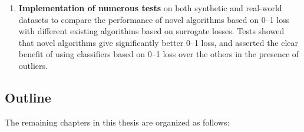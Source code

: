\begin{enumerate}[ (i)]
\item {\bf Implementation of numerous tests} on both synthetic and real-world datasets to compare the performance of novel algorithms based on 0--1 loss with different existing algorithms based on surrogate losses. Tests showed that novel algorithms give significantly better 0--1 loss, and asserted the clear benefit of using classifiers based on 0--1 loss over the others in the presence of outliers. 

\end{enumerate}


\subsection{Outline}
\label{sec:intro.outline}

The remaining chapters in this thesis are organized as follows:

